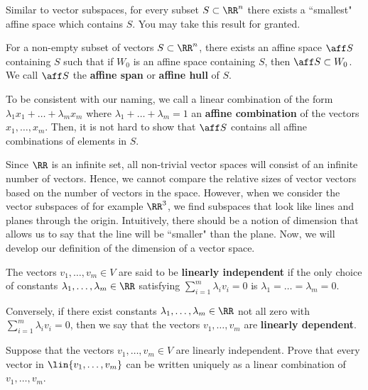 \documentclass[11pt]{article}
\begin{document}
Similar to vector subspaces, for every subset $S \subset \RR^n$ there exists a ``smallest" affine space which contains $S$. You may take this result for granted. 

\begin{defn} \label{definition-affine-span}
    For a non-empty subset of vectors $S \subset \RR^n$, there exists an affine space $\aff S$ containing $S$ such that if $W_0$ is an affine space containing $S$, then $\aff S \subset W_0$. We call $\aff S$ the \textbf{affine span} or \textbf{affine hull} of $S$. 
\end{defn}

\begin{remark}
    To be consistent with our naming, we call a linear combination of the form $\lambda_1 x_1 + \ldots + \lambda_m x_m$ where $\lambda_1 + \ldots + \lambda_m = 1$ an \textbf{affine combination} of the vectors $x_1, \ldots, x_m$. Then, it is not hard to show that $\aff S$ contains all affine combinations of elements in $S$. 
\end{remark}

Since $\RR$ is an infinite set, all non-trivial vector spaces will consist of an infinite number of vectors. Hence, we cannot compare the relative sizes of vector vectors based on the number of vectors in the space. However, when we consider the vector subspaces of for example $\RR^3$, we find subspaces that look like lines and planes through the origin. Intuitively, there should be a notion of dimension that allows us to say that the line will be ``smaller" than the plane. Now, we will develop our definition of the dimension of a vector space. 

\begin{defn}
    The vectors $v_1, \ldots, v_m \in V$ are said to be \textbf{linearly independent} if the only choice of constants $\lambda_1, \ldots, \lambda_m \in \RR$ satisfying $\sum_{i = 1}^m \lambda_i v_i = 0$ is $\lambda_1 = \ldots = \lambda_m = 0$. 
\end{defn}

Conversely, if there exist constants $\lambda_1, \ldots, \lambda_m \in \RR$ not all zero with $\sum_{i = 1}^m \lambda_i v_i = 0$, then we say that the vectors $v_1, \ldots, v_m$ are \textbf{linearly dependent}. 

\begin{prob}[5 points] \label{problem-linear-independence-uniqueness}
    Suppose that the vectors $v_1, \ldots, v_m \in V$ are linearly independent. Prove that every vector in $\lin \{v_1, \ldots, v_m\}$ can be written uniquely as a linear combination of $v_1, \ldots, v_m$. 
\end{prob}
\end{document}
